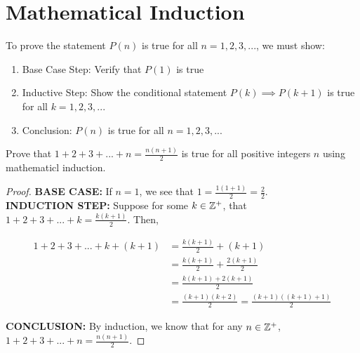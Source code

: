 \section{Mathematical Induction}

To prove the statement $P(n)$ is true for all $n = 1,2,3,...$, we must show:

    \begin{enumerate}
        \item Base Case Step: Verify that $P(1)$ is true
        \item Inductive Step: Show the conditional statement $P(k) \implies P(k+1)$ is true for all $k = 1,2,3,...$
        \item Conclusion: $P(n)$ is true for all $n=1,2,3,...$
    \end{enumerate}

\begin{problem}
    Prove that $1+2+3+...+n=\frac{n(n+1)}{2}$ is true for all positive integers $n$ using mathematicl induction.

    \begin{proof}
        \textbf{BASE CASE:} If $n=1$, we see that $1 = \frac{1(1+1)}{2}=\frac{2}{2}$.\\

        \textbf{INDUCTION STEP:} Suppose for some $k \in \mathbb{Z}^+$, that $1+2+3+...+k=\frac{k(k+1)}{2}$. Then, 

        $$
        \begin{aligned}
            1+2+3+...+k+(k+1)&=\frac{k(k+1)}{2}+(k+1)\\
            &= \frac{k(k+1)}{2} + \frac{2(k+1)}{2}\\
            &=\frac{k(k+1)+2(k+1)}{2}\\
            &=\frac{(k+1)(k+2)}{2} = \frac{(k+1)((k+1)+1)}{2}
        \end{aligned}
        $$

        \textbf{CONCLUSION:} By induction, we know that for any $n \in \mathbb{Z}^+$, $1+2+3+...+n=\frac{n(n+1)}{2}$.
    \end{proof}
\end{problem}\newpage


